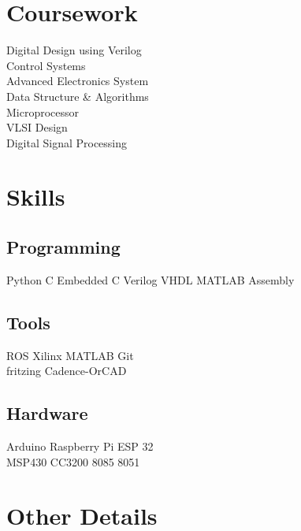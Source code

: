\documentclass[]{deedy-resume-openfont}
\begin{document}
\begin{minipage}[t]{0.33\textwidth}

\section{Coursework}

Digital Design using Verilog \\
Control Systems \\
Advanced Electronics System \\
Data Structure \& Algorithms \\
Microprocessor\\
VLSI Design \\
Digital Signal Processing \\
\sectionsep


\section{Skills}
\subsection{Programming}
Python \textbullet{} C \textbullet{} Embedded C \textbullet{} Verilog
VHDL \textbullet{} MATLAB \textbullet{} Assembly
\sectionsep

\subsection{Tools}
ROS \textbullet{} Xilinx \textbullet{} MATLAB \textbullet{} Git \\
fritzing \textbullet{} Cadence-OrCAD \\
\sectionsep


\subsection{Hardware}
Arduino \textbullet{} Raspberry Pi \textbullet{} ESP 32 \\
MSP430 \textbullet{} CC3200 \textbullet{} 8085 \textbullet{} 8051
\sectionsep


\section{Other Details}

\end{minipage}
\end{document}
